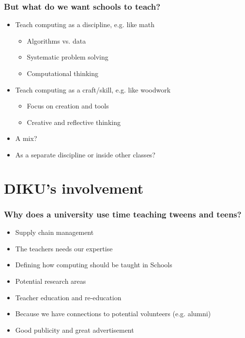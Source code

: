 \documentclass{beamer}
\begin{document}
\begin{frame}
  \frametitle{But what do we want schools to teach?}

  \begin{itemize}
  \item Teach computing as a discipline, e.g. like math
    \begin{itemize}
    \item Algorithms vs. data
    \item Systematic problem solving
    \item Computational thinking
    \end{itemize}
  \item Teach computing as a craft/skill, e.g. like woodwork
    \begin{itemize}
    \item Focus on creation and tools
    \item Creative and reflective thinking
    \end{itemize}
  \item A mix?
  \item As a separate discipline or inside other classes?
  \end{itemize}
\end{frame}

\section{DIKU's involvement}
\begin{frame}
\frametitle{Why does a university use time teaching tweens and teens?}
\begin{itemize}
\item Supply chain management
\item The teachers needs our expertise
\item Defining how computing should be taught in Schools
\item Potential research areas
\item Teacher education and re-education
\item Because we have connections to potential volunteers (e.g. alumni)
\item Good publicity and great advertisement
\end{itemize}
\end{frame}
\end{document}

